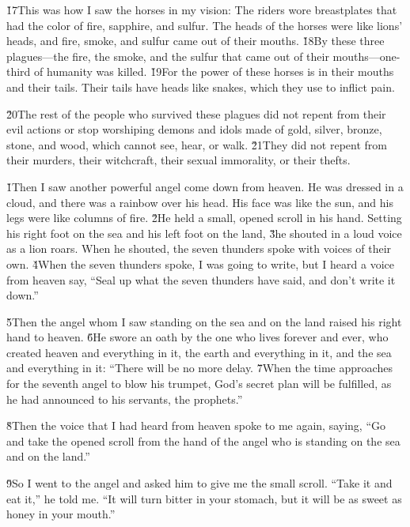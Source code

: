\v{17}This was how I saw the horses in my vision: The riders wore breastplates that had the color of fire, sapphire, and sulfur. The heads of the horses were like lions' heads, and fire, smoke, and sulfur came out of their mouths. \v{18}By these three plagues---the fire, the smoke, and the sulfur that came out of their mouths---one-third of humanity was killed. \v{19}For the power of these horses is in their mouths and their tails. Their tails have heads like snakes, which they use to inflict pain.

\v{20}The rest of the people who survived these plagues did not repent from their evil actions or stop worshiping demons and idols made of gold, silver, bronze, stone, and wood, which cannot see, hear, or walk. \v{21}They did not repent from their murders, their witchcraft, their sexual immorality, or their thefts.

\v{1}Then I saw another powerful angel come down from heaven. He was dressed in a cloud, and there was a rainbow over his head. His face was like the sun, and his legs were like columns of fire. \v{2}He held a small, opened scroll in his hand. Setting his right foot on the sea and his left foot on the land, \v{3}he shouted in a loud voice as a lion roars. When he shouted, the seven thunders spoke with voices of their own. \v{4}When the seven thunders spoke, I was going to write, but I heard a voice from heaven say, ``Seal up what the seven thunders have said, and don't write it down.''

\v{5}Then the angel whom I saw standing on the sea and on the land raised his right hand to heaven. \v{6}He swore an oath by the one who lives forever and ever, who created heaven and everything in it, the earth and everything in it, and the sea and everything in it: ``There will be no more delay. \v{7}When the time approaches for the seventh angel to blow his trumpet, God's secret plan will be fulfilled, as he had announced to his servants, the prophets.''

\v{8}Then the voice that I had heard from heaven spoke to me again, saying, ``Go and take the opened scroll from the hand of the angel who is standing on the sea and on the land.''

\v{9}So I went to the angel and asked him to give me the small scroll. ``Take it and eat it,'' he told me. ``It will turn bitter in your stomach, but it will be as sweet as honey in your mouth.''

